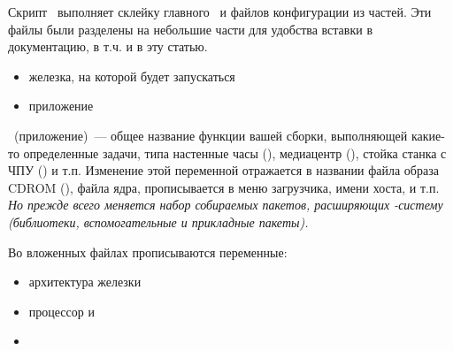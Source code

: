 {

Скрипт \ выполняет склейку главного \ и файлов
конфигурации из частей. Эти файлы были разделены на небольшие части для удобства
вставки в документацию, в т.ч. и в эту статью.



\begin{itemize}
  \item{} железка, на которой будет запускаться
  \item{} приложение
\end{itemize}


\ (приложение)\ --- общее название функции вашей сборки, выполняющей
какие-то определенные задачи, типа настенные часы (), медиацентр
(), стойка станка с ЧПУ () и т.п. Изменение этой
переменной отражается в названии файла образа CDROM (), файла ядра,
прописывается в меню загрузчика, имени хоста, и т.п. \emph{Но прежде всего
меняется набор собираемых пакетов, расширяющих -систему (библиотеки,
вспомогательные и прикладные пакеты).}

Во вложенных файлах прописываются переменные:

\begin{itemize}
  \item{} архитектура железки
  \item{} процессор и
  \item{} 
\end{itemize}


}
